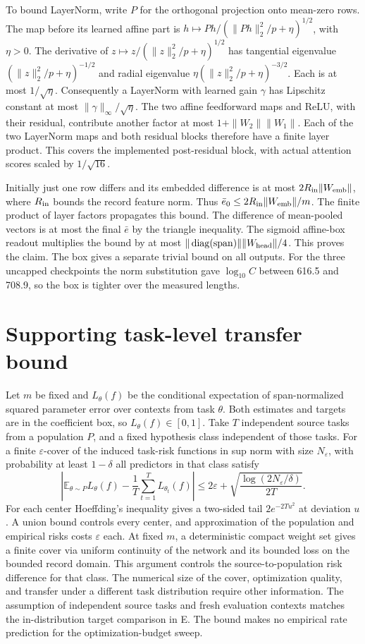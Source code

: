 \documentclass{article}
\DeclareMathOperator{\diag}{diag}
\begin{document}
To bound LayerNorm, write \(P\) for the orthogonal projection onto
mean-zero rows. The map before its learned affine part is
\(h\mapsto Ph/(\|Ph\|_2^2/p+\eta)^{1/2}\), with \(\eta>0\).
The derivative of \(z\mapsto z/(\|z\|_2^2/p+\eta)^{1/2}\)
has tangential eigenvalue \((\|z\|_2^2/p+\eta)^{-1/2}\) and radial
eigenvalue \(\eta(\|z\|_2^2/p+\eta)^{-3/2}\). Each is at most
\(1/\sqrt\eta\). Consequently a LayerNorm with learned gain \(\gamma\)
has Lipschitz constant at most \(\|\gamma\|_\infty/\sqrt\eta\).
The two affine feedforward maps and ReLU, with their residual,
contribute another factor at most \(1+\|W_2\|\|W_1\|\).
Each of the two LayerNorm maps and both residual blocks therefore
have a finite layer product. This covers the implemented post-residual
block, with actual attention scores scaled by \(1/\sqrt{16}\).

Initially just one row differs and its embedded difference is at most
\(2R_{\rm in}\|W_{\rm emb}\|\), where \(R_{\rm in}\) bounds the record
feature norm. Thus \(\bar e_0\le 2R_{\rm in}\|W_{\rm emb}\|/m\).
The finite product of layer factors propagates this bound. The difference
of mean-pooled vectors is at most the final \(\bar e\) by the triangle
inequality. The sigmoid affine-box readout multiplies the bound by at
most \(\|\diag(\mathrm{span})\|\|W_{\rm head}\|/4\). This proves the
claim. The box gives a separate trivial bound on all outputs. For the
three uncapped checkpoints the norm substitution gave
\(\log_{10} C\) between 616.5 and 708.9, so the box is tighter over
the measured lengths.

\section{Supporting task-level transfer bound}
\label{app:transfer}
Let \(m\) be fixed and \(L_\theta(f)\) be the conditional expectation
of span-normalized squared parameter error over contexts from task
\(\theta\). Both estimates and targets are in the coefficient box,
so \(L_\theta(f)\in[0,1]\). Take \(T\) independent source tasks from
a population \(P\), and a fixed hypothesis class independent of those
tasks. For a finite \(\varepsilon\)-cover of the induced task-risk
functions in sup norm with size \(N_\varepsilon\), with probability
at least \(1-\delta\) all predictors in that class satisfy
\[
 \left|\mathbb E_{\theta\sim P}L_\theta(f)
   -\frac{1}{T}\sum_{t=1}^T L_{\theta_t}(f)\right|
 \le 2\varepsilon+\sqrt{\frac{\log(2N_\varepsilon/\delta)}{2T}} .
\]
For each center Hoeffding's inequality gives a two-sided tail
\(2e^{-2Tu^2}\) at deviation \(u\). A union bound controls every
center, and approximation of the population and empirical risks
costs \(\varepsilon\) each. At fixed \(m\), a deterministic compact
weight set gives a finite cover via uniform continuity of the
network and its bounded loss on the bounded record domain.
This argument controls the source-to-population risk difference
for that class. The numerical size of the cover, optimization
quality, and transfer under a different task distribution require
other information. The assumption of independent source tasks and
fresh evaluation contexts matches the in-distribution target
comparison in E. The bound makes no empirical rate prediction for
the optimization-budget sweep.
\end{document}

